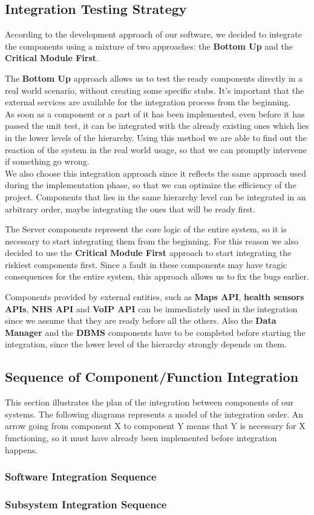 \clearpage
\subsection{Integration Testing Strategy}
According to the development approach of our software, we decided to integrate the components using a mixture of two approaches: the \textbf{Bottom Up} and the \textbf{Critical Module First}.

The \textbf{Bottom Up} approach allows us to test the ready components directly in a real world scenario, without creating some specific stubs. It's important that the external services are available for the integration process from the beginning.\\
As soon as a component or a part of it has been implemented, even before it has passed the unit test, it can be integrated with the already existing ones which lies in the lower levels of the hierarchy. Using this method we are able to find out the reaction of the system in the real world usage, so that we can promptly intervene if something go wrong.\\
We also choose this integration approach since it reflects the same approach used during the implementation phase, so that we can optimize the efficiency of the project.
Components that lies in the same hierarchy level can be integrated in an arbitrary order, maybe integrating the ones that will be ready first.

The Server components represent the core logic of the entire system, so it is necessary to start integrating them from the beginning.
For this reason we also decided to use the \textbf{Critical Module First} approach to start integrating the riskiest components first.
Since a fault in these components may have tragic consequences for the entire system, this approach allows us to fix the bugs earlier.

Components provided by external entities, such as \textbf{Maps API}, \textbf{health sensors APIs}, \textbf{NHS API} and \textbf{VoIP API} can be immediately used in the integration since we assume that they are ready before all the others. Also the \textbf{Data Manager} and the \textbf{DBMS} components have to be completed before starting the integration, since the lower level of the hierarchy strongly depends on them.\\
\subsection{Sequence of Component/Function Integration}
This section illustrates the plan of the integration between components of our systems. The following diagrams represents a model of the integration order. An arrow going from component X to component Y means that Y is necessary for X functioning, so it must have already been implemented before integration happens.

\subsubsection{Software Integration Sequence}
\subsubsection{Subsystem Integration Sequence}